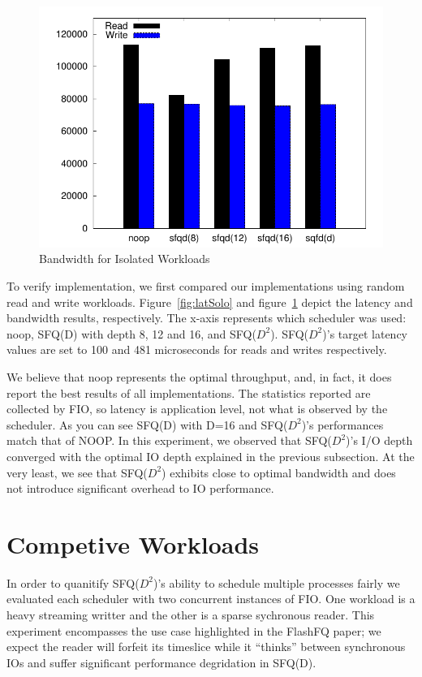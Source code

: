 \begin{figure}[t]
  \centering \includegraphics[width=\linewidth]{../../graphs/solo/bandwidth.pdf}
  \caption{Bandwidth for Isolated Workloads}
  \label{fig:bandSolo}
\end{figure}

To verify implementation, we first compared our implementations using
random read and write workloads. Figure~\ref{fig:latSolo} and
figure~\ref{fig:bandSolo} depict the latency and bandwidth results,
respectively. The x-axis represents which scheduler was used: noop,
SFQ(D) with depth 8, 12 and 16, and SFQ($D^2$). SFQ($D^2$)'s target
latency values are set to 100 and 481 microseconds for reads and
writes respectively.

We believe that noop represents the optimal throughput, and, in fact,
it does report the best results of all implementations. The statistics
reported are collected by FIO, so latency is application level, not
what is observed by the scheduler. As you can see SFQ(D) with D=16 and
SFQ($D^2$)'s performances match that of NOOP. In this experiment, we
observed that SFQ($D^2$)'s I/O depth converged with the optimal IO
depth explained in the previous subsection. At the very least, we see
that SFQ($D^2$) exhibits close to optimal bandwidth and does not
introduce significant overhead to IO performance.

\section{Competive Workloads}

In order to quanitify SFQ($D^2$)'s ability to schedule multiple
processes fairly we evaluated each scheduler with two concurrent
instances of FIO. One workload is a heavy streaming writter and the
other is a sparse sychronous reader. This experiment encompasses the
use case highlighted in the FlashFQ paper; we expect the reader will
forfeit its timeslice while it ``thinks'' between synchronous IOs and
suffer significant performance degridation in SFQ(D). 

